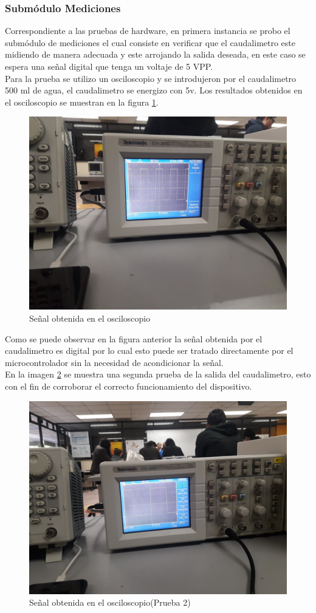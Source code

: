 \subsubsection{Submódulo Mediciones}
Correspondiente a las pruebas de hardware, en primera instancia se probo el submódulo de mediciones el cual consiste en verificar que el caudalimetro este midiendo de manera adecuada y este arrojando la salida deseada, en este caso se espera una señal digital que tenga un voltaje de 5 VPP.
\\
Para la prueba se utilizo un osciloscopio y se introdujeron por el caudalimetro 500 ml de agua, el caudalimetro se energizo con 5v. Los resultados obtenidos en el osciloscopio se muestran en la figura \ref{fig:senial_caudal}.
\begin{figure}[H]
	\centering
	\includegraphics[width=1\textwidth]{Capitulo6/unitarias/hardware/img/senial}
	\caption{Señal obtenida en el osciloscopio}
	\label{fig:senial_caudal}
\end{figure}
Como se puede observar en la figura anterior la señal obtenida por el caudalimetro es digital por lo cual esto puede ser tratado directamente por el microcontrolador sin la necesidad de acondicionar la señal.
\\
En la imagen \ref{fig:senial_caudal_anexo} se muestra una segunda prueba de la salida del caudalimetro, esto con el fin de corroborar el correcto funcionamiento del dispositivo.
\begin{figure}[H]
	\centering
	\includegraphics[width=1\textwidth]{Capitulo6/unitarias/hardware/img/senial_2}
	\caption{Señal obtenida en el osciloscopio(Prueba 2)}
	\label{fig:senial_caudal_anexo}
\end{figure}